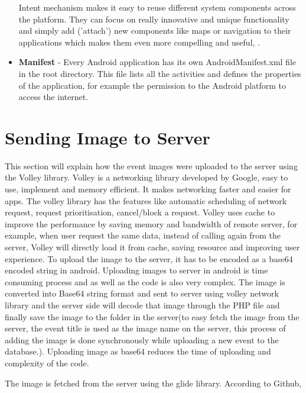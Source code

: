 \begin{appendices}
\begin{itemize}
	Intent mechanism makes it easy to reuse different system components across the platform. They can
	focus on really innovative and unique functionality and simply add (’attach’) new components
	like maps or navigation to their applications which makes them even more compelling and
	useful, \cite{kwon2016design}.
	
	\item \textbf{Manifest} - 
	Every Android application has its own AndroidManifest.xml file in the root directory. This file lists all the activities and defines the properties of the application, for example the permission to the Android platform to access the internet.
\end{itemize}

\section{Sending Image to Server}
\label{sending_image_server_appendix}
This section will explain how the event images were uploaded to the server using the Volley library. 
Volley is a networking library developed by Google, easy to use, implement and memory efficient. 
It makes networking faster and easier for apps. The volley library has the features like automatic scheduling of network request, request prioritisation, cancel/block a request. Volley uses cache to improve the  performance by saving memory and bandwidth of remote server, for example, when user request the same data, instead of calling again from the server, Volley will directly load it from cache, saving resource and improving user experience.
To upload the image to the server, it has to be encoded as a base64 encoded string in android. Uploading images to server in android is time consuming process and as well as the code is also very complex. The image is converted into Base64 string format and sent to server using volley network library and the server side will decode that image through the  PHP file and finally save the image to the folder in the server(to easy fetch the image from the server, the event title is used as the image name on the server, this process of adding the image is done synchronously while uploading a new event to the database.). Uploading image as base64 reduces the time of uploading and complexity of the code.

The image is fetched from the server using the glide library. According to Github, 


\end{appendices}
